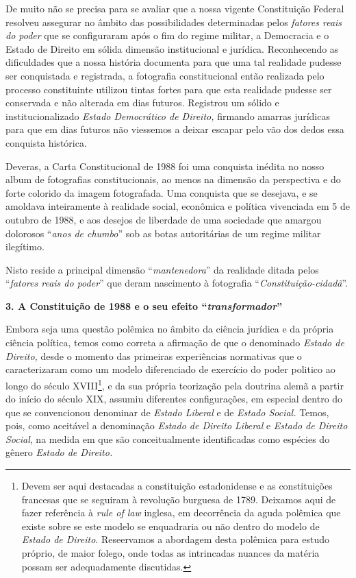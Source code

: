 De muito não se precisa para se avaliar que a nossa vigente Constituição
Federal resolveu assegurar no âmbito das possibilidades determinadas
pelos \emph{fatores reais do poder} que se configuraram após o fim do
regime militar, a Democracia e o Estado de Direito em sólida dimensão
institucional e jurídica. Reconhecendo as dificuldades que a nossa
história documenta para que uma tal realidade pudesse ser conquistada e
registrada, a fotografia constitucional então realizada pelo processo
constituinte utilizou tintas fortes para que esta realidade pudesse ser
conservada e não alterada em dias futuros. Registrou um sólido e
institucionalizado \emph{Estado Democrático de Direito,} firmando
amarras jurídicas para que em dias futuros não viessemos a deixar
escapar pelo vão dos dedos essa conquista histórica.

Deveras, a Carta Constitucional de 1988 foi uma conquista inédita no
nosso album de fotografias constitucionais, ao menos na dimensão da
perspectiva e do forte colorido da imagem fotografada. Uma conquista que
se desejava, e se amoldava inteiramente à realidade social, econômica e
política vivenciada em 5 de outubro de 1988, e aos desejos de liberdade
de uma sociedade que amargou dolorosos ``\emph{anos de chumbo}'' sob as
botas autoritárias de um regime militar ilegítimo.

Nisto reside a principal dimensão ``\emph{mantenedora}'' da realidade
ditada pelos ``\emph{fatores reais do poder}'' que deram nascimento à
fotografia ``\emph{Constituição-cidadã}''.

\textbf{3. A Constituição de 1988 e o seu efeito
``\emph{transformador}''}

Embora seja uma questão polêmica no âmbito da ciência jurídica e da
própria ciência política, temos como correta a afirmação de que o
denominado \emph{Estado de Direito,} desde o momento das primeiras
experiências normativas que o caracterizaram como um modelo diferenciado
de exercício do poder politico ao longo do século XVIII\footnote{Devem
  ser aqui destacadas a constituição estadonidense e as constituições
  francesas que se seguiram à revolução burguesa de 1789. Deixamos aqui
  de fazer referência à \emph{rule of law} inglesa, em decorrência da
  aguda polêmica que existe sobre se este modelo se enquadraria ou não
  dentro do modelo de \emph{Estado de Direito}. Reseervamos a abordagem
  desta polêmica para estudo próprio, de maior folego, onde todas as
  intrincadas nuances da matéria possam ser adequadamente discutidas.},
e da sua própria teorização pela doutrina alemã a partir do início do
século XIX, assumiu diferentes configurações, em especial dentro do que
se convencionou denominar de \emph{Estado Liberal} e de \emph{Estado
Social.} Temos, pois, como aceitável a denominação \emph{Estado de
Direito Liberal} e \emph{Estado de Direito Social}, na medida em que são
conceitualmente identificadas como espécies do gênero \emph{Estado de
Direito.}

